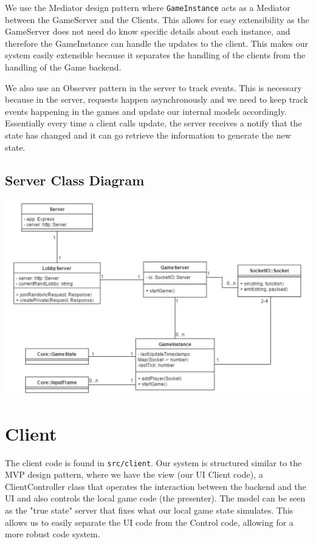 \documentclass[12pt]{report}
\begin{document}
We use the Mediator design pattern where \texttt{GameInstance} acts as a Mediator between the GameServer and the Clients. This allows for easy extensibility as the GameServer does not need do know specific details about each instance, and therefore the GameInstance can handle the updates to the client. This makes our system easily extensible because it separates the handling of the clients from the handling of the Game backend. 

We also use an Observer pattern in the server to track events. This is necessary because in the server, requests happen asynchronously and we need to keep track events happening in the games and update our internal models accordingly. Essentially every time a client calls update, the server receives a notify that the state has changed and it can go retrieve the information to generate the new state. 

\subsection{Server Class Diagram}
\includegraphics[width=\linewidth]{images/server_classes.png}

\section{Client}

The client code is found in \texttt{src/client}. Our system is structured similar to the MVP design pattern, where we have the view (our UI Client code), a ClientController class that operates the interaction between the backend and the UI and also controls the local game code (the presenter). The model can be seen as the "true state" server that fixes what our local game state simulates. This allows us to easily separate the UI code from the Control code, allowing for a more robust code system. 
\end{document}
